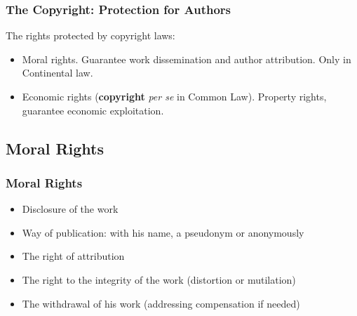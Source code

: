 \documentclass{beamer}
\begin{document}

%
%
%


\begin{frame}
\frametitle{The Copyright: Protection for Authors}

The rights protected by copyright laws:
\begin{itemize}
\item \alert{Moral rights}. Guarantee work dissemination and author attribution.
Only in Continental law.
\item \alert{Economic rights} (\textbf{copyright} \textit{per se} in Common Law). Property rights, guarantee economic exploitation.
\end{itemize}

\end{frame}

\subsection{Moral Rights}
\begin{frame}
\frametitle{Moral Rights}

\begin{itemize}
\item Disclosure of the work
\item Way of publication: with his name, a pseudonym or anonymously
\item The right of attribution
\item The right to the integrity of the work (distortion or mutilation)
\item The withdrawal of his work (addressing compensation if needed)
\end{itemize}

\end{frame}
\end{document}
